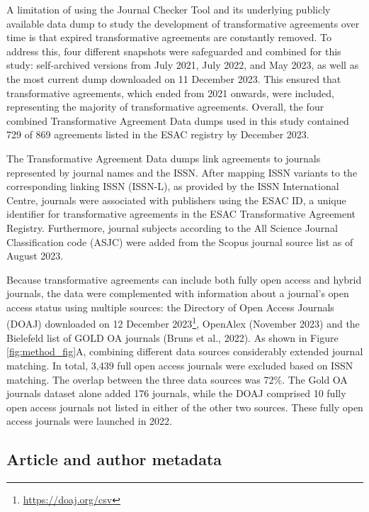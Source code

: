 \documentclass[a4paper,man,floatsintext,longtable,noextraspace,12pt]{apa6}
\begin{document}
A limitation of using the Journal Checker Tool and its underlying
publicly available data dump to study the development of transformative
agreements over time is that expired transformative agreements are
constantly removed. To address this, four different snapshots were
safeguarded and combined for this study: self-archived versions from
July 2021, July 2022, and May 2023, as well as the most current dump
downloaded on 11 December 2023. This ensured that transformative
agreements, which ended from 2021 onwards, were included, representing
the majority of transformative agreements. Overall, the four combined
Transformative Agreement Data dumps used in this study contained 729 of
869 agreements listed in the ESAC registry by December 2023.

The Transformative Agreement Data dumps link agreements to journals
represented by journal names and the ISSN. After mapping ISSN variants
to the corresponding linking ISSN (ISSN-L), as provided by the ISSN
International Centre, journals were associated with publishers using the
ESAC ID, a unique identifier for transformative agreements in the ESAC
Transformative Agreement Registry. Furthermore, journal subjects
according to the All Science Journal Classification code (ASJC) were
added from the Scopus journal source list as of August 2023.

Because transformative agreements can include both fully open access and
hybrid journals, the data were complemented with information about a
journal's open access status using multiple sources: the Directory of
Open Access Journals (DOAJ) downloaded on 12 December 2023\footnote{\url{https://doaj.org/csv}},
OpenAlex (November 2023) and the Bielefeld list of GOLD OA journals
(Bruns et al., 2022). As shown in Figure \ref{fig:method_fig}A,
combining different data sources considerably extended journal matching.
In total, 3,439 full open access journals were excluded based on ISSN
matching. The overlap between the three data sources was 72\%. The Gold
OA journals dataset alone added 176 journals, while the DOAJ comprised
10 fully open access journals not listed in either of the other two
sources. These fully open access journals were launched in 2022.

\hypertarget{article-and-author-metadata}{%
\subsection{Article and author
metadata}\label{article-and-author-metadata}}
\end{document}
